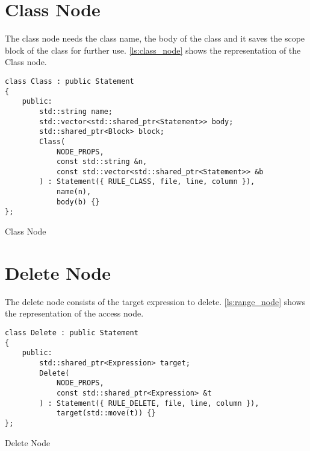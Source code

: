 \section{Class Node}

The class node needs the class name, the body of the class and it saves the scope block of the class for further use.
\autoref{ls:class_node} shows the representation of the Class node.

\begin{listing}[H]
\begin{verbatim}
class Class : public Statement
{
    public:
        std::string name;
        std::vector<std::shared_ptr<Statement>> body;
        std::shared_ptr<Block> block;
        Class(
            NODE_PROPS,
            const std::string &n,
            const std::vector<std::shared_ptr<Statement>> &b
        ) : Statement({ RULE_CLASS, file, line, column }),
            name(n),
            body(b) {}
};
\end{verbatim}
\caption{Class Node}
\label{ls:class_node}
\end{listing}

\section{Delete Node}

The delete node consists of the target expression to delete.
\autoref{ls:range_node} shows the representation of the access node.

\begin{listing}[H]
\begin{verbatim}
class Delete : public Statement
{
    public:
        std::shared_ptr<Expression> target;
        Delete(
            NODE_PROPS,
            const std::shared_ptr<Expression> &t
        ) : Statement({ RULE_DELETE, file, line, column }),
            target(std::move(t)) {}
};
\end{verbatim}
\caption{Delete Node}
\label{ls:delete_node}
\end{listing}
